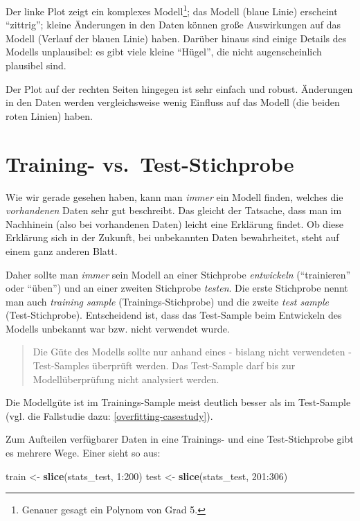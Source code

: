 \documentclass[12pt,ngerman,]{book}
\makeatletter
\newenvironment{Shaded}{\begin{snugshade}}{\end{snugshade}}
\newcommand{\KeywordTok}[1]{\textcolor[rgb]{0.13,0.29,0.53}{\textbf{{#1}}}}
\newcommand{\DecValTok}[1]{\textcolor[rgb]{0.00,0.00,0.81}{{#1}}}
\newcommand{\StringTok}[1]{\textcolor[rgb]{0.31,0.60,0.02}{{#1}}}
\newcommand{\NormalTok}[1]{{#1}}
\let\rmarkdownfootnote\footnote%
\def\footnote{\protect\rmarkdownfootnote}
\newenvironment{kframe}{%
\medskip{}
\setlength{\fboxsep}{.8em}
 \def\at@end@of@kframe{}%
 \ifinner\ifhmode%
  \def\at@end@of@kframe{\end{minipage}}%
  \begin{minipage}{\columnwidth}%
 \fi\fi%
 \def\FrameCommand##1{\hskip\@totalleftmargin \hskip-\fboxsep
 \colorbox{shadecolor}{##1}\hskip-\fboxsep
     \hskip-\linewidth \hskip-\@totalleftmargin \hskip\columnwidth}%
 \MakeFramed {\advance\hsize-\width
   \@totalleftmargin\z@ \linewidth\hsize
   \@setminipage}}%
 {\par\unskip\endMakeFramed%
 \at@end@of@kframe}
\renewenvironment{Shaded}{\begin{kframe}}{\end{kframe}}
\theoremstyle{definition}
\theoremstyle{definition}
\theoremstyle{remark}
\makeatother
\begin{document}
Der linke Plot zeigt ein komplexes Modell\footnote{Genauer gesagt ein
  Polynom von Grad 5.}; das Modell (blaue Linie) erscheint ``zittrig'';
kleine Änderungen in den Daten können große Auswirkungen auf das Modell
(Verlauf der blauen Linie) haben. Darüber hinaus sind einige Details des
Modells unplausibel: es gibt viele kleine ``Hügel'', die nicht
augenscheinlich plausibel sind.

Der Plot auf der rechten Seiten hingegen ist sehr einfach und robust.
Änderungen in den Daten werden vergleichsweise wenig Einfluss auf das
Modell (die beiden roten Linien) haben.

\section{Training-
vs.~Test-Stichprobe}\label{training--vs.test-stichprobe}

Wie wir gerade gesehen haben, kann man \emph{immer} ein Modell finden,
welches die \emph{vorhandenen} Daten sehr gut beschreibt. Das gleicht
der Tatsache, dass man im Nachhinein (also bei vorhandenen Daten) leicht
eine Erklärung findet. Ob diese Erklärung sich in der Zukunft, bei
unbekannten Daten bewahrheitet, steht auf einem ganz anderen Blatt.

Daher sollte man \emph{immer} sein Modell an einer Stichprobe
\emph{entwickeln} (``trainieren'' oder ``üben'') und an einer zweiten
Stichprobe \emph{testen}. Die erste Stichprobe nennt man auch
\emph{training sample} (Trainings-Stichprobe) und die zweite \emph{test
sample} (Test-Stichprobe). Entscheidend ist, dass das Test-Sample beim
Entwickeln des Modells unbekannt war bzw. nicht verwendet wurde.

\begin{quote}
Die Güte des Modells sollte nur anhand eines - bislang nicht verwendeten
- Test-Samples überprüft werden. Das Test-Sample darf bis zur
Modellüberprüfung nicht analysiert werden.
\end{quote}

Die Modellgüte ist im Trainings-Sample meist deutlich besser als im
Test-Sample (vgl. die Fallstudie dazu: \ref{overfitting-casestudy}).

Zum Aufteilen verfügbarer Daten in eine Trainings- und eine
Test-Stichprobe gibt es mehrere Wege. Einer sieht so aus:

\begin{Shaded}
\begin{Highlighting}[]
\NormalTok{train <-}\StringTok{ }\KeywordTok{slice}\NormalTok{(stats_test, }\DecValTok{1}\NormalTok{:}\DecValTok{200}\NormalTok{)}
\NormalTok{test <-}\StringTok{ }\KeywordTok{slice}\NormalTok{(stats_test, }\DecValTok{201}\NormalTok{:}\DecValTok{306}\NormalTok{)}
\end{Highlighting}
\end{Shaded}
\end{document}

